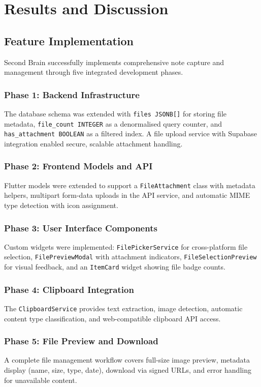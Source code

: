 \documentclass[10pt,twocolumn,a4paper]{article}
\begin{document}
\section{Results and Discussion}

\subsection{Feature Implementation}

Second Brain successfully implements comprehensive note capture and management through five
integrated development phases.

\subsubsection{Phase 1: Backend Infrastructure}
The database schema was extended with \texttt{files JSONB[]} for storing file metadata,
\texttt{file\_count INTEGER} as a denormalised query counter, and \texttt{has\_attachment
BOOLEAN} as a filtered index. A file upload service with Supabase integration enabled secure,
scalable attachment handling.

\subsubsection{Phase 2: Frontend Models and API}
Flutter models were extended to support a \texttt{FileAttachment} class with metadata helpers,
multipart form-data uploads in the API service, and automatic MIME type detection with icon
assignment.

\subsubsection{Phase 3: User Interface Components}
Custom widgets were implemented: \texttt{FilePickerService} for cross-platform file selection,
\texttt{FilePreviewModal} with attachment indicators, \texttt{FileSelectionPreview} for visual
feedback, and an \texttt{ItemCard} widget showing file badge counts.

\subsubsection{Phase 4: Clipboard Integration}
The \texttt{ClipboardService} provides text extraction, image detection, automatic content
type classification, and web-compatible clipboard API access.

\subsubsection{Phase 5: File Preview and Download}
A complete file management workflow covers full-size image preview, metadata display (name,
size, type, date), download via signed URLs, and error handling for unavailable content.
\end{document}

